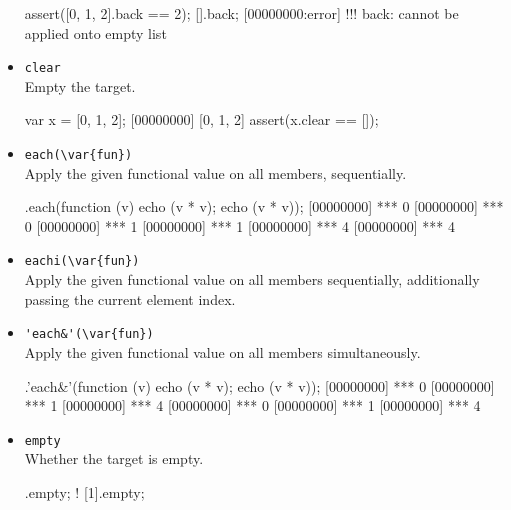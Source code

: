 \begin{itemize}
\begin{urbiscript}
assert([0, 1, 2].back == 2);
[].back;
[00000000:error] !!! back: cannot be applied onto empty list
\end{urbiscript}

\item \lstinline|clear|\\
  Empty the target.

\begin{urbiscript}
var x = [0, 1, 2];
[00000000] [0, 1, 2]
assert(x.clear == []);
\end{urbiscript}

\item \lstinline|each(\var{fun})|\\
  Apply the given functional value  on all members,
  sequentially.

\begin{urbiscript}
[0, 1, 2].each(function (v) {echo (v * v); echo (v * v)});
[00000000] *** 0
[00000000] *** 0
[00000000] *** 1
[00000000] *** 1
[00000000] *** 4
[00000000] *** 4
\end{urbiscript}

\item \lstinline|eachi(\var{fun})|\\
  Apply the given functional value  on all members
  sequentially, additionally passing the current element index.


\item \lstinline|'each&'(\var{fun})|\\
Apply the given functional value on all members simultaneously.

\begin{urbiscript}
[0, 1, 2].'each&'(function (v) {echo (v * v); echo (v * v)});
[00000000] *** 0
[00000000] *** 1
[00000000] *** 4
[00000000] *** 0
[00000000] *** 1
[00000000] *** 4
\end{urbiscript}

\item \lstinline|empty|\\
  Whether the target is empty.

\begin{urbiassert}
[].empty;
! [1].empty;
\end{urbiassert}


\end{itemize}
